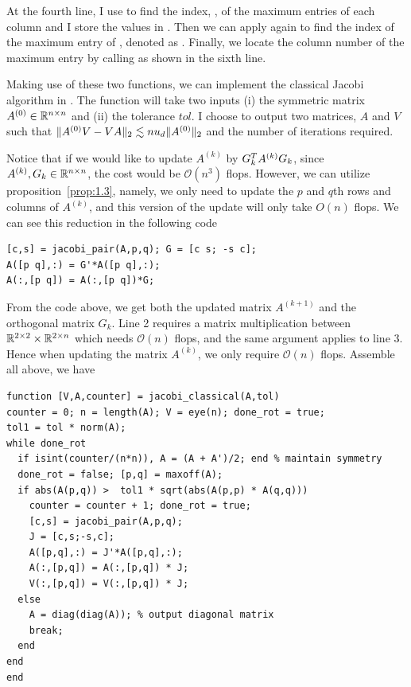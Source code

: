 At the fourth line, I use  to find the index, , of the maximum entries of each column and I store the values in . Then we can apply  again to find the index of the maximum entry of , denoted as . Finally, we locate the column number of the maximum entry by calling  as shown in the sixth line.

Making use of these two functions, we can implement the classical Jacobi algorithm in \mat. The function  will take two inputs (i) the symmetric matrix $A^{(0)}\in\mathbb{R}^{n\times n}$ and (ii) the tolerance $tol$. I choose to output two matrices, $A$ and $V$ such that $\|{A^{(0)} V - VA}\|_2 \lesssim nu_d\|{A^{(0)}}\|_2$ and the number of iterations required. 

Notice that if we would like to update $A^{(k)}$ by $G_k^T A^{(k)}G_k$, since $A^{(k)},G_k\in\mathbb{R}^{n\times n}$, the cost would be $\mathcal O(n^3)$ flops. However, we can utilize proposition~\ref{prop:1.3}, namely, we only need to update the $p$ and $q$th rows and columns of $A^{(k)}$, and this version of the update will only take $O(n)$ flops. We can see this reduction in the following code 

\begin{lstlisting}
[c,s] = jacobi_pair(A,p,q); G = [c s; -s c];
A([p q],:) = G'*A([p q],:); 
A(:,[p q]) = A(:,[p q])*G;
\end{lstlisting}
From the code above, we get both the updated matrix $A^{(k+1)}$ and the orthogonal matrix $G_k$. Line 2 requires a matrix multiplication between $\mathbb{R}^{2\times 2}\times \mathbb{R}^{2\times n}$ which needs $\mathcal O(n)$ flops, and the same argument applies to line 3. Hence when updating the matrix $A^{(k)}$, we only require $\mathcal O(n)$ flops. Assemble all above, we have  

\begin{lstlisting}
function [V,A,counter] = jacobi_classical(A,tol)
counter = 0; n = length(A); V = eye(n); done_rot = true;
tol1 = tol * norm(A);
while done_rot
  if isint(counter/(n*n)), A = (A + A')/2; end % maintain symmetry
  done_rot = false; [p,q] = maxoff(A);
  if abs(A(p,q)) >  tol1 * sqrt(abs(A(p,p) * A(q,q)))
    counter = counter + 1; done_rot = true;
    [c,s] = jacobi_pair(A,p,q);
    J = [c,s;-s,c]; 
    A([p,q],:) = J'*A([p,q],:);
    A(:,[p,q]) = A(:,[p,q]) * J;
    V(:,[p,q]) = V(:,[p,q]) * J;
  else
    A = diag(diag(A)); % output diagonal matrix
    break;
  end
end
end
\end{lstlisting}

